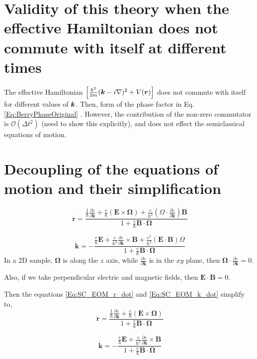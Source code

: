 \documentclass{revtex4-2}
\newcommand{\bvec}[1]{{\mathbf #1}}
\renewcommand\vec[1]{\ensuremath\boldsymbol{#1}} %
\begin{document}
\section{Validity of this theory when the effective Hamiltonian does not commute with itself at different times}
The effective Hamiltonian $\left[\frac{\hbar^2}{2m}(\vec{k} - i \nabla)^2 + V(\vec{r}) \right]$ does not commute with itself for different values of $\vec{k}$. Then, form of the phase factor in Eq. \eqref{Eq:BerryPhaseOriginal} . However, the contribution of the non-zero commutator is $\mathcal{O} \left(\Delta{t}^2\right)$ (need to show this explicitly), and does not effect the semiclassical equations of motion.
\section{Decoupling of the equations of motion and their simplification}
\begin{equation}~\label{Eq:SC_EOM_r_dot}
	\dot{\bvec{r}} = \frac{\frac{1}{\hbar} \frac{\partial \varepsilon}{\partial \bvec{k}} + \frac{e}{\hbar} (\bvec{E}\times\bvec{\Omega}) + \frac{e}{\hbar^2} (\Omega \cdot \frac{\partial \varepsilon}{\partial \bvec{k}} )\bvec{B}}{1 + \frac{e}{\hbar} \bvec{B}\cdot\bvec{\Omega}}
\end{equation}

\begin{equation}~\label{Eq:SC_EOM_k_dot}
	\dot{\bvec{k}} = -\frac{\frac{e}{\hbar} \bvec{E} +\frac{e}{\hbar^2} \frac{\partial \varepsilon}{\partial \bvec{k}} \times \bvec{B} + \frac{e^2}{\hbar^2} (\bvec{E}\cdot\bvec{B})\Omega}{1 + \frac{e}{\hbar} \bvec{B}\cdot\bvec{\Omega}}
\end{equation}
In a 2D sample, $\bvec{\Omega}$ is along the $z$ axis, while $\frac{\partial \varepsilon}{\partial \bvec{k}}$ is in the $xy$ plane, then $\bvec{\Omega} \cdot \frac{\partial \varepsilon}{\partial \bvec{k}} = 0$.

Also, if we take perpendicular electric and magnetic fields, then $\bvec{E}\cdot \bvec{B} = 0$.

Then the equations \eqref{Eq:SC_EOM_r_dot} and \eqref{Eq:SC_EOM_k_dot} simplify to,
\begin{equation}~\label{Eq:SC_EOM_r_dot_decoupled}
	\dot{\bvec{r}} = \frac{\frac{1}{\hbar} \frac{\partial \varepsilon}{\partial \bvec{k}} + \frac{e}{\hbar} (\bvec{E}\times\bvec{\Omega})}{1 + \frac{e}{\hbar} \bvec{B}\cdot\bvec{\Omega}}
\end{equation}

\begin{equation}~\label{Eq:SC_EOM_k_dot_decoupled}
	\dot{\bvec{k}} = -\frac{\frac{e}{\hbar} \bvec{E} +\frac{e}{\hbar^2} \frac{\partial \varepsilon}{\partial \bvec{k}} \times \bvec{B}}{1 + \frac{e}{\hbar} \bvec{B}\cdot\bvec{\Omega}}
\end{equation}
\end{document}
